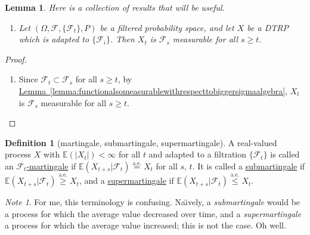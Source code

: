 \documentclass[a4paper]{scrartcl}
\newcommand{\defn}[1]{\ul{#1}}
\theoremstyle{definition}
\newtheorem{definition}{Definition}[section]
\theoremstyle{plain}
\newtheorem{lemma}{Lemma}[section]
\theoremstyle{remark}
\newtheorem{note}{Note}[section]
\begin{document}
\begin{lemma}
  Here is a collection of results that will be useful.
  \begin{enumerate}
    \item Let $(\Omega, \mathcal{F}, \{ \mathcal{F}_{t} \}, P)$ be a filtered probability space, and let $X$ be a DTRP which is adapted to $\{ \mathcal{F}_{i} \}$. Then $X_{t}$ is $\mathcal{F}_{s}$ measurable for all $s \geq t$.
  \end{enumerate}
\end{lemma}
\begin{proof}
  $\,$
  \begin{enumerate}
    \item Since $\mathcal{F}_{t} \subset \mathcal{F}_{s}$ for all $s \geq t$, by \hyperref[lemma:functionalsomeasurablewithrespecttobiggersigmaalgebra]{Lemma~\ref*{lemma:functionalsomeasurablewithrespecttobiggersigmaalgebra}}, $X_{t}$ is $\mathcal{F}_{s}$ measurable for all $s \geq t$.
  \end{enumerate}
\end{proof}

\begin{definition}[martingale, submartingale, supermartingale]
  \label{def:subsupermartingale}
  A real-valued process $X$ with $\mathbb{E}(|X_{t}|) < \infty$ for all $t$ and adapted to a filtration $\{\mathcal{F}_{t}\}$ is called an \defn{$\mathcal{F}_{t}$-martingale} if $\mathbb{E}(X_{t+s}|\mathcal{F}_{t}) \overset{\mathrm{a.e.}}{=} X_{t}$ for all $s$, $t$. It is called a \defn{submartingale} if $\mathbb{E}(X_{t+s}|\mathcal{F}_{t}) \overset{\mathrm{a.e.}}{\geq} X_{t}$, and a \defn{supermartingale} if $\mathbb{E}(X_{t+s}|\mathcal{F}_{t}) \overset{\mathrm{a.e.}}{\leq} X_{t}$.
\end{definition}

\begin{note}
  For me, this terminology is confusing. Na\"{\i}vely, a \emph{submartingale} would be a process for which the average value decreased over time, and a \emph{supermartingale} a process for which the average value increased; this is not the case. Oh well.
\end{note}
\end{document}
